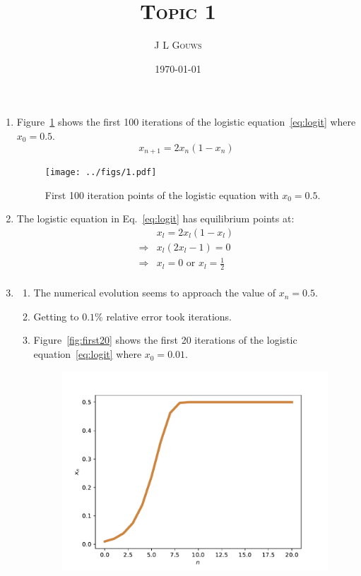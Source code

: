 \documentclass[12pt,a4]{article}
\title{
\textsc{Topic 1}
}
\author{\textsc{J L Gouws}
}
\date{\today
\\[1cm]}
\begin{document}
\thispagestyle{empty}

\maketitle

\begin{enumerate}
  \item
    Figure~\ref{fig:1} shows the first 100 iterations of the logistic equation~\ref{eq:logit} where $x_0 = 0.5$.
    \begin{equation}
      x_{n + 1} = 2 x_{n} (1 - x_{n}) 
      \label{eq:logit}
    \end{equation}
    \begin{figure}[H]
      \centering
      \texttt{[image: ../figs/1.pdf]}
      \caption{First 100 iteration points of the logistic equation with $x_0 = 0.5$.}
      \label{fig:1}
    \end{figure}
  \item
    The logistic equation in Eq.~\ref{eq:logit} has equilibrium points at:
    \begin{align*}
                  & x_{l} = 2 x_{l} (1 - x_{l}) \\
      \Rightarrow & x_l(2 x_{l} - 1 ) = 0 \\
      \Rightarrow & x_l = 0  \text{ or } x_l = \frac{1}{2}\\
    \end{align*}
  \item
    \begin{enumerate}
      \item
        The numerical evolution seems to approach the value of $x_n = 0.5$.
      \item
        Getting to $0.1\%$ relative error took  iterations.
      \item
        Figure~\ref{fig:first20} shows the first 20 iterations of the logistic equation~\ref{eq:logit} where $x_0 = 0.01$.
        \begin{figure}[H]
          \centering
          \includegraphics[scale = 0.6]{../figs/first20.pdf}

\end{figure}
\end{enumerate}
\end{enumerate}
\end{document}
